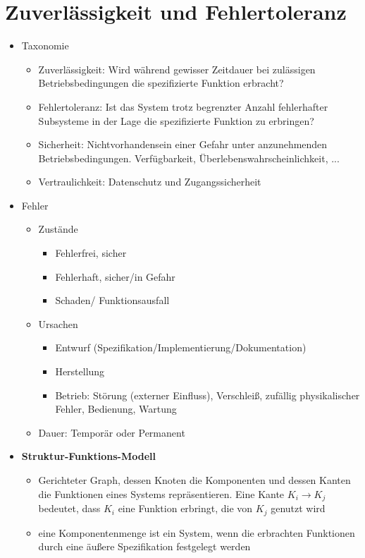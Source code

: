 \section{Zuverlässigkeit und Fehlertoleranz}
\begin{itemize}
	\item Taxonomie
	\begin{itemize}
		\item Zuverlässigkeit: Wird während gewisser Zeitdauer bei zulässigen Betriebsbedingungen die spezifizierte Funktion erbracht?
		\item Fehlertoleranz: Ist das System trotz begrenzter Anzahl fehlerhafter Subsysteme in der Lage die spezifizierte Funktion zu erbringen?
		\item Sicherheit: Nichtvorhandensein einer Gefahr unter anzunehmenden Betriebsbedingungen. Verfügbarkeit, Überlebenswahrscheinlichkeit, ...
		\item Vertraulichkeit: Datenschutz und Zugangssicherheit
	\end{itemize}
	\item Fehler
	\begin{itemize}
		\item Zustände
		\begin{itemize}
			\item Fehlerfrei, sicher
			\item Fehlerhaft, sicher/in Gefahr
			\item Schaden/ Funktionsausfall
		\end{itemize}
		\item Ursachen
		\begin{itemize}
			\item Entwurf (Spezifikation/Implementierung/Dokumentation)
			\item Herstellung
			\item Betrieb: Störung (externer Einfluss), Verschleiß, zufällig physikalischer Fehler, Bedienung,  Wartung
		\end{itemize}
		\item Dauer: Temporär oder Permanent
	\end{itemize}
	\item \textbf{Struktur-Funktions-Modell}
	\begin{itemize}
		\item Gerichteter Graph, dessen Knoten die Komponenten und dessen Kanten die Funktionen eines Systems repräsentieren. Eine Kante \(K_i \longrightarrow K_j\) bedeutet, dass \(K_i\) eine Funktion erbringt, die von \(K_j\) genutzt wird
		\item eine Komponentenmenge ist ein System, wenn die erbrachten Funktionen durch eine äußere Spezifikation festgelegt werden		

\end{itemize}
\end{itemize}
